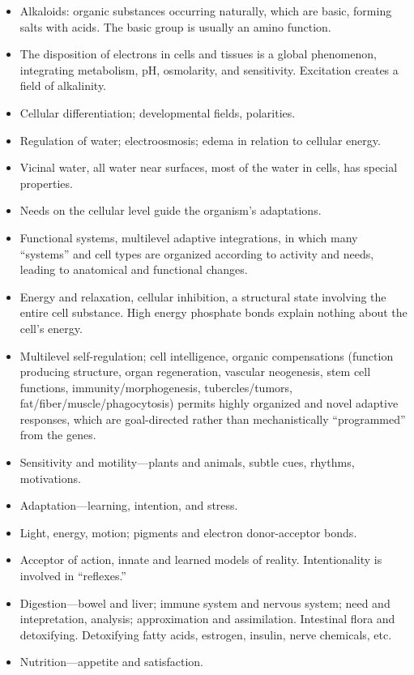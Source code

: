 \documentclass{article}
\begin{document}
\begin{itemize}
    \item Alkaloids: organic substances occurring naturally, which are basic, forming salts with acids. The basic group is usually an amino function.
    \item The disposition of electrons in cells and tissues is a global phenomenon, integrating metabolism, pH, osmolarity, and sensitivity. Excitation creates a field of alkalinity.
    \item Cellular differentiation; developmental fields, polarities.
    \item Regulation of water; electroosmosis; edema in relation to cellular energy.
    \item Vicinal water, all water near surfaces, most of the water in cells, has special properties.
    \item Needs on the cellular level guide the organism’s adaptations.
    \item Functional systems, multilevel adaptive integrations, in which many “systems” and cell types are organized according to activity and needs, leading to anatomical and functional changes.
    \item Energy and relaxation, cellular inhibition, a structural state involving the entire cell substance. High energy phosphate bonds explain nothing about the cell’s energy.
    \item Multilevel self-regulation; cell intelligence, organic compensations (function producing structure, organ regeneration, vascular neogenesis, stem cell functions, immunity/morphogenesis, tubercles/tumors, fat/fiber/muscle/phagocytosis) permits highly organized and novel adaptive responses, which are goal-directed rather than mechanistically “programmed” from the genes.
    \item Sensitivity and motility—plants and animals, subtle cues, rhythms, motivations.
    \item Adaptation—learning, intention, and stress.
    \item Light, energy, motion; pigments and electron donor-acceptor bonds.
    \item Acceptor of action, innate and learned models of reality. Intentionality is involved in “reflexes.”
    \item Digestion—bowel and liver; immune system and nervous system; need and intepretation, analysis; approximation and assimilation. Intestinal flora and detoxifying. Detoxifying fatty acids, estrogen, insulin, nerve chemicals, etc.
    \item Nutrition—appetite and satisfaction.

\end{itemize}
\end{document}
